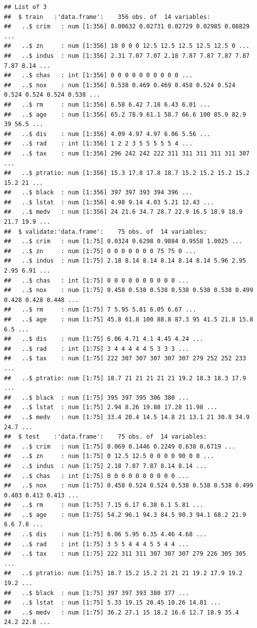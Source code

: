 \documentclass[]{book}
\theoremstyle{break}
\theoremstyle{definition}
\theoremstyle{definition}
\theoremstyle{definition}
\theoremstyle{remark}
\begin{document}
\begin{verbatim}
## List of 3
##  $ train   :'data.frame':    356 obs. of  14 variables:
##   ..$ crim   : num [1:356] 0.00632 0.02731 0.02729 0.02985 0.08829 ...
##   ..$ zn     : num [1:356] 18 0 0 0 12.5 12.5 12.5 12.5 12.5 0 ...
##   ..$ indus  : num [1:356] 2.31 7.07 7.07 2.18 7.87 7.87 7.87 7.87 7.87 8.14 ...
##   ..$ chas   : int [1:356] 0 0 0 0 0 0 0 0 0 0 ...
##   ..$ nox    : num [1:356] 0.538 0.469 0.469 0.458 0.524 0.524 0.524 0.524 0.524 0.538 ...
##   ..$ rm     : num [1:356] 6.58 6.42 7.18 6.43 6.01 ...
##   ..$ age    : num [1:356] 65.2 78.9 61.1 58.7 66.6 100 85.9 82.9 39 56.5 ...
##   ..$ dis    : num [1:356] 4.09 4.97 4.97 6.06 5.56 ...
##   ..$ rad    : int [1:356] 1 2 2 3 5 5 5 5 5 4 ...
##   ..$ tax    : num [1:356] 296 242 242 222 311 311 311 311 311 307 ...
##   ..$ ptratio: num [1:356] 15.3 17.8 17.8 18.7 15.2 15.2 15.2 15.2 15.2 21 ...
##   ..$ black  : num [1:356] 397 397 393 394 396 ...
##   ..$ lstat  : num [1:356] 4.98 9.14 4.03 5.21 12.43 ...
##   ..$ medv   : num [1:356] 24 21.6 34.7 28.7 22.9 16.5 18.9 18.9 21.7 19.9 ...
##  $ validate:'data.frame':    75 obs. of  14 variables:
##   ..$ crim   : num [1:75] 0.0324 0.6298 0.9884 0.9558 1.0025 ...
##   ..$ zn     : num [1:75] 0 0 0 0 0 0 0 75 75 0 ...
##   ..$ indus  : num [1:75] 2.18 8.14 8.14 8.14 8.14 8.14 5.96 2.95 2.95 6.91 ...
##   ..$ chas   : int [1:75] 0 0 0 0 0 0 0 0 0 0 ...
##   ..$ nox    : num [1:75] 0.458 0.538 0.538 0.538 0.538 0.538 0.499 0.428 0.428 0.448 ...
##   ..$ rm     : num [1:75] 7 5.95 5.81 6.05 6.67 ...
##   ..$ age    : num [1:75] 45.8 61.8 100 88.8 87.3 95 41.5 21.8 15.8 6.5 ...
##   ..$ dis    : num [1:75] 6.06 4.71 4.1 4.45 4.24 ...
##   ..$ rad    : int [1:75] 3 4 4 4 4 4 5 3 3 3 ...
##   ..$ tax    : num [1:75] 222 307 307 307 307 307 279 252 252 233 ...
##   ..$ ptratio: num [1:75] 18.7 21 21 21 21 21 19.2 18.3 18.3 17.9 ...
##   ..$ black  : num [1:75] 395 397 395 306 380 ...
##   ..$ lstat  : num [1:75] 2.94 8.26 19.88 17.28 11.98 ...
##   ..$ medv   : num [1:75] 33.4 20.4 14.5 14.8 21 13.1 21 30.8 34.9 24.7 ...
##  $ test    :'data.frame':    75 obs. of  14 variables:
##   ..$ crim   : num [1:75] 0.069 0.1446 0.2249 0.638 0.6719 ...
##   ..$ zn     : num [1:75] 0 12.5 12.5 0 0 0 0 90 0 0 ...
##   ..$ indus  : num [1:75] 2.18 7.87 7.87 8.14 8.14 ...
##   ..$ chas   : int [1:75] 0 0 0 0 0 0 0 0 0 0 ...
##   ..$ nox    : num [1:75] 0.458 0.524 0.524 0.538 0.538 0.538 0.499 0.403 0.413 0.413 ...
##   ..$ rm     : num [1:75] 7.15 6.17 6.38 6.1 5.81 ...
##   ..$ age    : num [1:75] 54.2 96.1 94.3 84.5 90.3 94.1 68.2 21.9 6.6 7.8 ...
##   ..$ dis    : num [1:75] 6.06 5.95 6.35 4.46 4.68 ...
##   ..$ rad    : int [1:75] 3 5 5 4 4 4 5 5 4 4 ...
##   ..$ tax    : num [1:75] 222 311 311 307 307 307 279 226 305 305 ...
##   ..$ ptratio: num [1:75] 18.7 15.2 15.2 21 21 21 19.2 17.9 19.2 19.2 ...
##   ..$ black  : num [1:75] 397 397 393 380 377 ...
##   ..$ lstat  : num [1:75] 5.33 19.15 20.45 10.26 14.81 ...
##   ..$ medv   : num [1:75] 36.2 27.1 15 18.2 16.6 12.7 18.9 35.4 24.2 22.8 ...
\end{verbatim}
\end{document}
